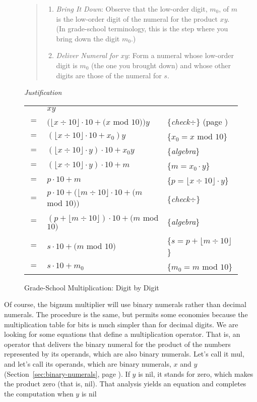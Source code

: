 \begin{figure}
\begin{quote}
\begin{enumerate}
\item \emph{Bring It Down}:
Observe that the low-order digit, $m_0$, of $m$
is the low-order digit of the numeral for the product $x y$.
(In grade-school terminology,
this is the step where you bring down the digit $m_0$.)

\item \emph{Deliver Numeral for $x y$}:
Form a numeral whose low-order digit is $m_0$ (the one you brought down)
and whose other digits are those of the numeral for $s$.
\end{enumerate}
\end{quote}

\emph{Justification}
\begin{center}
\begin{tabular}{cll}
    & $x y$ & \\
$=$ & $(\lfloor x \div 10\rfloor \cdot 10 + (x$ mod $10)) y$  & \{\emph{check}$\div$\} (page \pageref{third-grade-division})\\
$=$ & $(\lfloor x \div 10\rfloor \cdot 10 + x_0) y$           & \{$x_0=x$ mod $10$\}\\
$=$ & $(\lfloor x \div 10\rfloor \cdot y) \cdot 10 + x_0 y$   & \{\emph{algebra}\} \\
$=$ & $(\lfloor x \div 10\rfloor \cdot y) \cdot 10 + m$       & \{$m=x_0\cdot y$\} \\
$=$ & $p \cdot 10 + m$                                        & \{$p=\lfloor x \div 10\rfloor \cdot y$\} \\
$=$ & $p \cdot 10 + (\lfloor m \div 10 \rfloor \cdot 10 + (m$ mod $10))$& \{\emph{check}$\div$\} \\
$=$ & $(p + \lfloor m \div 10 \rfloor) \cdot 10 + (m$ mod $10)$       & \{\emph{algebra}\} \\
$=$ & $s \cdot 10 + (m$ mod $10)$                             & \{$s=p + \lfloor m \div 10 \rfloor$\} \\
$=$ & $s \cdot 10 + m_0$                                      & \{$m_0=m$ mod $10$\} \\
\end{tabular}
\end{center}
\label{multiplication!grade school}
\caption{Grade-School Multiplication: Digit by Digit}
\label{fig:grade-school-mult}
\end{figure}

Of course, the bignum multiplier
will use binary numerals rather than decimal numerals.
The procedure is the same, but permits some economies
because the multiplication table for bits is much simpler
than for decimal digits.
We are looking for some equations that define a multiplication operator.
That is, an operator that delivers the binary numeral for the product of the numbers
represented by its operands, which are also binary numerals.
Let's call it \textsf{mul}, and let's call its operands, which are binary numerals,
$x$ and $y$ (Section~\ref{sec:binary-numerals}, page \pageref{sec:binary-numerals}).
If $y$ is nil, it stands for zero, 
which makes the product zero (that is, \textsf{nil}).
That analysis yields an equation and completes
the computation when $y$ is \textsf{nil}

